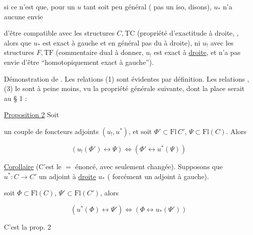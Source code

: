 si ce n'est que, pour un $u$ tant soit peu général ( pas un iso, disons), $u_*$ n'a aucune envie

d'être compatible avec les structures $C,\mathrm{TC}$ (propriété d'exactitude  à droite, , alors que $u_*$ est exact à gauche et  en général pas du  à droite), ni $u_!$ avec les structures $F,\mathrm{TF}$ (commentaire dual à donner, $u_!$ est exact à \uline{droite}, et n'a pas envie d'être ``homotopiquement exact à gauche'').

Démonstration de . Les relations (1) sont évidentes par définition. Les relations , (3) le sont à peine moins, vu la propriété  générale suivante, dont la place serait au § 1 :

\uline{Proposition 2} Soit


un couple de foncteurs adjoints $(u_!,u^*)$, et soit $\Phi'\subset\mathrm{Fl}\,C'$, $\Psi\subset\mathrm{Fl}(C)$. Alors

\[ (u_!(\Phi')\longleftrightarrow\Psi)\Longleftrightarrow(\Phi'\longleftrightarrow u^*(\Psi)) \]

\uline{Corollaire} (C'est le $=$ énoncé, avec seulement   changée). Supposons que $u^*:C\to C'$  un adjoint à \uline{droite} $u_*$ ( forcément un adjoint à gauche).


soit $\Phi\subset\mathrm{Fl}(C)$, $\Psi'\subset\mathrm{Fl}(C')$, alors

\[ (u^*(\Phi)\longleftrightarrow\Psi')\Longleftrightarrow(\Phi\longleftrightarrow u_*(\Psi')) \]

C'est la prop. 2   



